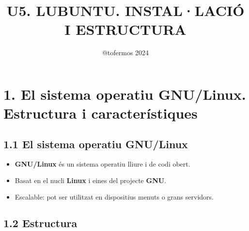 \documentclass[
  a4paper,
]{article}
\title{U5. LUBUNTU. INSTAL·LACIÓ I ESTRUCTURA}
\author{@tofermos 2024}
\date{}
\providecommand{\tightlist}{%
  \setlength{\itemsep}{0pt}\setlength{\parskip}{0pt}}
\begin{document}
\maketitle

{
\setcounter{tocdepth}{2}
\tableofcontents
}
\newpage
\renewcommand\tablename{Tabla}

\section{1. El sistema operatiu GNU/Linux. Estructura i
característiques}\label{el-sistema-operatiu-gnulinux.-estructura-i-caracteruxedstiques}

\subsection{1.1 El sistema operatiu
GNU/Linux}\label{el-sistema-operatiu-gnulinux}

\begin{itemize}
\tightlist
\item
  \textbf{GNU/Linux} és un sistema operatiu lliure i de codi obert.
\item
  Basat en el nucli \textbf{Linux} i eines del projecte \textbf{GNU}.
\item
  Escalable: pot ser utilitzat en dispositius menuts o grans servidors.
\end{itemize}

\subsection{1.2 Estructura}\label{estructura}
\end{document}
